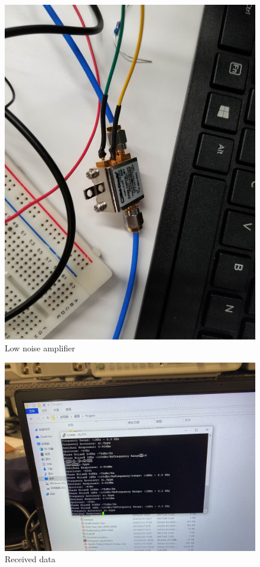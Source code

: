 \documentclass[12pt,a4paper]{report}
\begin{document}
\begin{figure}[ht]
    \centerline{\includegraphics[scale=0.2]{LNA.PNG}}
    \caption{Low noise amplifier}
    \label{fig:LNA}
\end{figure}

\begin{figure}[ht]
    \centerline{\includegraphics[scale=0.1]{ReceiverPC.png}}
    \caption{Received data}
    \label{fig:DataR}
\end{figure}
\end{document}
